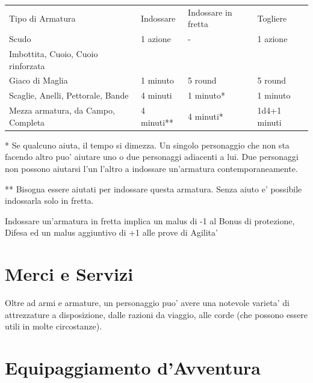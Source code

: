 \documentclass[a4paper,11pt,twoside,openany]{dndbook}
\begin{document}
{\bigskip

\begin{tabular}[c]{@{}llll@{}}
\toprule 
Tipo di Armatura & Indossare & Indossare in fretta & Togliere\tabularnewline
Scudo & 1 azione & - & 1 azione\tabularnewline
Imbottita, Cuoio, Cuoio rinforzata\\
Giaco di Maglia & 1 minuto & 5 round & 5 round\tabularnewline
Scaglie, Anelli, Pettorale, Bande & 4 minuti & 1 minuto{*} & 1 minuto\tabularnewline
Mezza armatura, da Campo, Completa & 4 minuti{*}{*} & 4 minuti{*} & 1d4+1 minuti\tabularnewline
\bottomrule
\end{tabular}

\bigskip

{*} Se qualcuno aiuta, il tempo si dimezza. Un singolo personaggio che non sta facendo altro puo' aiutare uno o due personaggi adiacenti a lui. Due personaggi non possono aiutarsi l'un l'altro a indossare un'armatura contemporaneamente.

{*}{*} Bisogna essere aiutati per indossare questa armatura. Senza aiuto e' possibile indossarla solo in fretta.

Indossare un'armatura in fretta implica un malus di -1 al Bonus di protezione, Difesa ed un malus aggiuntivo di +1 alle prove di Agilita'

\pagebreak

\section{Merci e Servizi}

\label{merci-e-servizi}

Oltre ad armi e armature, un personaggio puo' avere una notevole varieta' di attrezzature a disposizione, dalle razioni da viaggio, alle corde (che possono essere utili in molte circostanze). 


\section{Equipaggiamento d'Avventura}\label{Equipaggiamento}

\label{equipaggiamento-davventura}


}
\end{document}
